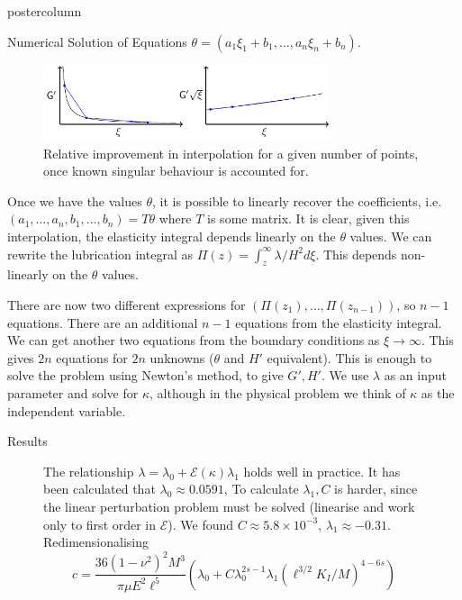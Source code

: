 \documentclass{beamer}
\newcommand{\cE}{\mathcal{E}}                               %
\begin{document}
\begin{frame}
\begin{columns}
\begin{column}{.57\textwidth}
\begin{beamercolorbox}[center]{postercolumn}
\begin{minipage}{.98\textwidth}
{\begin{myblock}{Numerical Solution of Equations}
$\theta = (a_1 \xi_1 + b_1, \dots , a_n \xi_n +b_n)$.
\begin{figure}
\begin{minipage}{0.9\textwidth}
\centering\includegraphics[width=0.75\textwidth]{Fig9.pdf}
\caption{Relative improvement in interpolation for a given number of points,
once known singular behaviour is accounted for.}
\end{minipage}
\end{figure}
Once we have the values $\theta$, it is possible to linearly recover
the coefficients, i.e. $(a_1,\dots, a_n,b_1,\dots , b_n) = T \theta$ where
$T$ is some matrix. It is clear, given this interpolation, the elasticity
integral depends linearly on the $\theta$ values.
We can rewrite the lubrication integral as  
$\Pi(z) = \int_{z}^{\infty} \lambda/H^2 d\xi$. This depends non-linearly
on the $\theta$ values. 

There are now two different expressions for $(\Pi(z_1) , \dots , \Pi(z_{n-1}))$,
so $n-1$ equations. There
are an additional $n-1$ equations from the elasticity integral. We can get
another two equations from the boundary conditions as $\xi\to\infty$.
This gives $2n$ equations for $2n$ unknowns ($\theta$ and $H'$ equivalent).
This is enough to solve the problem using Newton's method, to give $G',H'$.
We use $\lambda$ as an input parameter and solve for $\kappa$, although in
the physical problem we think of $\kappa$ as the independent variable.
\end{myblock}\vfill
\begin{myblock}{Results}
\begin{figure}
\begin{minipage}{0.55\textwidth}
The relationship $\lambda = \lambda_0 + \cE(\kappa) \lambda_1$ holds
well in practice. It has been calculated that $\lambda_0 \approx 0.0591$,
To calculate $\lambda_1,C$ is harder, since the linear perturbation problem
must be solved (linearise and  work only to first order in $\cE$). We found
$C \approx 5.8 \times 10^{-3}$, $\lambda_1 \approx -0.31$. Redimensionalising
\[ c = \frac{36(1-\nu^2)^2M^3}{\pi \mu E^2 \ell^5}\left(\lambda_0 + C 
\lambda_0^{2s-1}\lambda_1 (\ell^{3/2}K_I/M)^{4-6s} \right) \]


\end{minipage}
\end{figure}
\end{myblock}}
\end{minipage}
\end{beamercolorbox}
\end{column}
\end{columns}
\end{frame}
\end{document}
